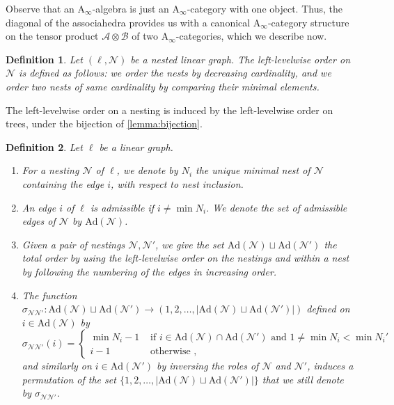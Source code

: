 \documentclass[twoside, 12pt]{amsart}
\newtheorem{definition}{Definition}[section]
\theoremstyle{remark}
\newcommand{\cat}[1]{\mathcal{#1}}
\newcommand{\gra}{\ell}
\begin{document}
Observe that an $\mathrm{A}_\infty$-algebra is just an $\mathrm{A}_\infty$-category with one object.
Thus, the diagonal of the associahedra provides us with a canonical 
$\mathrm{A}_\infty$-category structure on the tensor product $\cat{A}\otimes \cat{B}$ of two $\mathrm{A}_\infty$-categories, which we describe now. 

\begin{definition}
Let $(\gra,\mathcal{N})$ be a nested linear graph. The \emph{left-levelwise order} on $\mathcal{N}$ is defined as follows: we order the nests by decreasing cardinality, and we order two nests of same cardinality by comparing their minimal elements. 
\end{definition}
The left-levelwise order on a nesting is induced by the left-levelwise order on trees, under the bijection of \cref{lemma:bijection}.

\begin{definition} 
\label{def:signs}
Let $\gra$ be a linear graph.  
\begin{enumerate}[leftmargin=*]
\item For a nesting $\mathcal{N}$ of $\gra$, we denote by $N_i$ the unique minimal nest of $\mathcal{N}$ containing the edge $i$, with respect to nest inclusion. 
\item An edge $i$ of $\gra$ is \emph{admissible} if $i \neq \min N_i$. We denote the set of admissible edges of $\mathcal{N}$ by $\mathrm{Ad}(\mathcal{N})$. 
\item Given a pair of nestings $\mathcal{N}, \mathcal{N}'$, we give the set $\mathrm{Ad}(\mathcal{N})\sqcup \mathrm{Ad}(\mathcal{N}')$ the total order by using the left-levelwise order on the nestings and within a nest by following the numbering of the edges in increasing order. 
\item The function $\sigma_{\mathcal{N}\mathcal{N}'}: \mathrm{Ad}(\mathcal{N})\sqcup \mathrm{Ad}(\mathcal{N}') \to (1,2,\ldots,|\mathrm{Ad}(\mathcal{N})\sqcup \mathrm{Ad}(\mathcal{N}')|)$ defined on $i \in \mathrm{Ad}(\mathcal{N})$ by 
\begin{equation*}
  \sigma_{\mathcal{N}\mathcal{N}'}(i)= 
  \begin{cases}
    \min N_i -1 & \text{ if } i \in \mathrm{Ad}(\mathcal{N})\cap \mathrm{Ad}(\mathcal{N}') \text{ and } 1 \neq \min N_i < \min N_i' \\ 
    i-1 & \text{ otherwise ,} 
  \end{cases}
\end{equation*}
and similarly on $i \in \mathrm{Ad}(\mathcal{N}')$ by inversing the roles of $\mathcal{N}$ and $\mathcal{N}'$, induces a permutation of the set $\{1,2,\ldots,|\mathrm{Ad}(\mathcal{N})\sqcup \mathrm{Ad}(\mathcal{N}')|\}$ that we still denote by $\sigma_{\mathcal{N}\mathcal{N}'}$.
\end{enumerate}
\end{definition}
\end{document}
